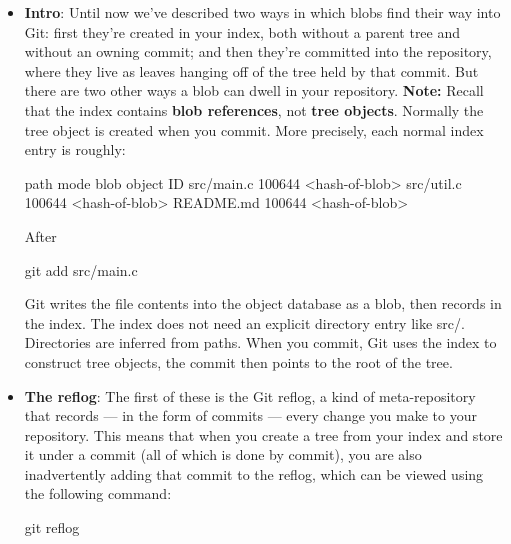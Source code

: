 \documentclass{report}
\begin{document}
    \pagebreak 
    \begin{itemize}
        \item \textbf{Intro}: Until now we’ve described two ways in which blobs find their way into Git: first they’re created in your index, both without a parent tree and without an owning commit; and then they’re committed into the repository, where they live as leaves hanging off of the tree held by that commit. But there are two other ways a blob can dwell in your repository.
            \bigbreak \noindent 
            \textbf{Note:} Recall that the index contains \textbf{blob references}, not \textbf{tree objects}. Normally the tree object is created when you commit. 
            \bigbreak \noindent 
            More precisely, each normal index entry is roughly:
            \bigbreak \noindent 
            \begin{bashcode}
                path              mode        blob object ID
                src/main.c        100644      <hash-of-blob>
                src/util.c        100644      <hash-of-blob>
                README.md         100644      <hash-of-blob>
            \end{bashcode}
            \bigbreak \noindent 
            After
            \bigbreak \noindent 
            \begin{bashcode}
            git add src/main.c
            \end{bashcode}
            \bigbreak \noindent 
            Git writes the file contents into the object database as a blob, then records in the index. The index does not need an explicit directory entry like src/. Directories are inferred from paths. When you commit, Git uses the index to construct tree objects, the commit then points to the root of the tree.
        \item \textbf{The reflog}:  The first of these is the Git reflog, a kind of meta-repository that records — in the form of commits — every change you make to your repository. This means that when you create a tree from your index and store it under a commit (all of which is done by commit), you are also inadvertently adding that commit to the reflog, which can be viewed using the following command:
            \bigbreak \noindent 
            \begin{bashcode}
            git reflog


\end{bashcode}
\end{itemize}
\end{document}
